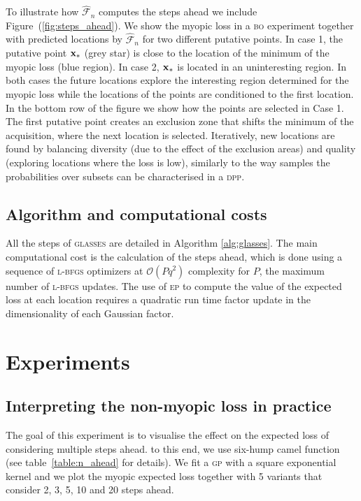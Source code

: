 \documentclass[twoside]{article}
\newcommand{\future}{\mathcal{F}}
\newcommand{\acr}[1]{\textsc{#1}\xspace}
\newcommand{\gp}{\acr{gp}}
\newcommand{\dpp}{\acr{dpp}}
\newcommand{\us}{\acr{glasses}}
\newcommand{\lbfgs}{\acr{l-bfgs}}
\newcommand{\ep}{\acr{ep}}
\newcommand{\bo}{\acr{bo}}
\begin{document}
To illustrate how $\hat{\future}_n$ computes the steps ahead we include Figure~(\ref{fig:steps_ahead}). We show the myopic loss in a \bo experiment together with predicted locations by $\hat{\future}_n$ for two different putative points. In case 1, the putative point $\mathbf{x}_*$ (grey star) is close to the location of the minimum of the myopic loss (blue region). In case 2, $\mathbf{x}_*$ is located in an uninteresting region. In both cases the future locations explore the interesting region determined for the myopic loss while the locations of the points are conditioned to the first location. In the bottom row of the figure we show how the points are selected in Case 1. The first putative point creates an exclusion zone that shifts the minimum of the acquisition, where the next location is selected. Iteratively, new locations are found by balancing diversity (due to the effect of the exclusion areas) and quality (exploring locations where the loss is low), similarly to the way samples the probabilities over subsets can be characterised in a \dpp \citep{MAL-044}.
 

\subsection{Algorithm and computational costs}
All the steps of \us are detailed in Algorithm \ref{alg:glasses}. The main computational cost is the calculation of the steps ahead, which is done using a sequence of \lbfgs optimizers at $\mathcal{O}(Pq^2)$ complexity for $P$, the maximum number of \lbfgs updates. The use of \ep to compute the value of the expected loss at each location requires a  quadratic run  time  factor  update in the dimensionality of each Gaussian factor.

\section{Experiments}\label{sec:experiments}



\subsection{Interpreting the non-myopic loss in practice}
The goal of this experiment is to visualise the effect on the expected loss of considering multiple steps ahead. to this end, we use six-hump camel function (see table~\ref{table:n_ahead} for details). We fit a \gp with a square exponential kernel and we plot the myopic expected loss together with 5 variants that consider 2, 3, 5, 10 and 20 steps ahead. 
\end{document}

